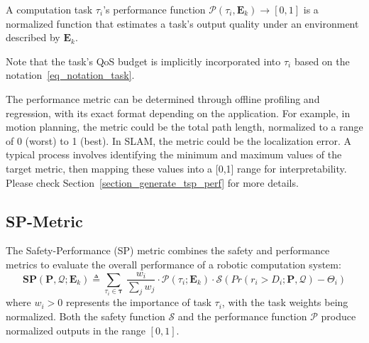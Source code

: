 	\begin{definition}
    \label{def_perf_metric}
		A computation task $\tau_i$'s performance function $\mathcal{P}(\tau_i, \textbf{E}_k) \rightarrow [0,1]$ is a normalized function that estimates a task's output quality under an environment described by $\textbf{E}_k$.
	\end{definition}

	Note that the task's QoS budget is implicitly incorporated into $\tau_i$ based on the notation~\eqref{eq_notation_task}.

    The performance metric can be determined through offline profiling and regression, with its exact format depending on the application.
    For example, in motion planning, the metric could be the total path length, normalized to a range of 0 (worst) to 1 (best).
    In SLAM, the metric could be the localization error.
    A typical process involves identifying the minimum and maximum values of the target metric, then mapping these values into a [0,1] range for interpretability.
    Please check Section~\ref{section_generate_tsp_perf} for more details.

	\subsection{SP-Metric}
	The Safety-Performance (SP) metric combines the safety and performance metrics to evaluate the overall performance of a robotic computation system:
	\begin{equation}
		\textbf{SP}(\boldsymbol{P}, \boldsymbol{\mathcal{Q}}; \textbf{E}_k) \triangleq \sum_{\tau_i \in \boldsymbol{\tau}} \
		\frac{w_i}{\sum_j w_j} \cdot \mathcal{P}(\tau_i; \textbf{E}_k) \cdot
		\mathcal{S}(Pr(r_i > D_i ; \boldsymbol{P}, \boldsymbol{\mathcal{Q}}) - \Theta_i)
		\label{eq_sp_def}
	\end{equation}
	where $w_i > 0$ represents the importance of task $\tau_i$, with the task weights being normalized.
    Both the safety function $\mathcal{S}$ and the performance function $\mathcal{P}$ produce normalized outputs in the range $[0,1]$.



